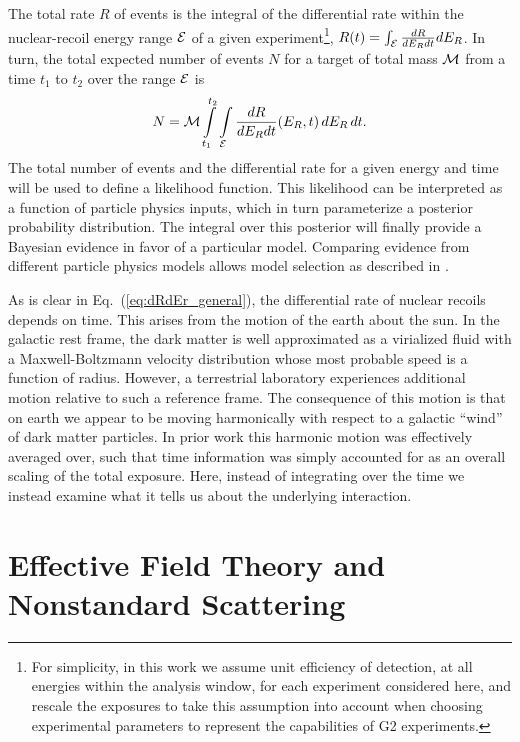 \documentclass[11pt]{article}
\newcommand{\beq}{\begin{equation}} \newcommand{\eeq}{\end{equation}}
\newcommand{\Eq}[1]{Eq.~(\ref{#1})} \newcommand{\Eqs}[2]{Eqs.~(\ref{#1}) and (\ref{#2})} \newcommand{\Eqm}[2]{Eqs.~(\ref{#1}) through (\ref{#2})}
\begin{document}
The total rate $R$ of events is the integral of the differential rate within the nuclear-recoil energy range ${\cal E}$ of a given experiment\footnote{For simplicity, in this work we assume unit efficiency of detection, at all energies within the analysis window, for each experiment considered here, and rescale the exposures to take this assumption into account when choosing experimental parameters to represent the capabilities of G2 experiments.}, $R(t)=\int_{\cal E} \frac{dR}{dE_R dt} dE_R$. In turn, the total expected number of events $N$ for a target of total mass ${\cal M}$ from a time $t_1$ to $t_2$ over the range ${\cal E}$ is
\beq
N =  \cM \int\limits_{t_1}^{t_2} \int\limits_\cE  \frac{dR}{dE_R dt}(E_R,t)\,dE_R \,dt.
\eeq
The total number of events and the differential rate for a given energy and time will be used to define a likelihood function. This likelihood can be interpreted as a function of particle physics inputs, which in turn parameterize a posterior probability distribution. The integral over this posterior will finally provide a Bayesian evidence in favor of a particular model. Comparing evidence from different particle physics models allows model selection as described in \cite{Gluscevic:2014vga, Gluscevic:2015sqa}.

As is clear in \Eq{eq:dRdEr_general}, the differential rate of nuclear recoils depends on time. This arises from the motion of the earth about the sun. In the galactic rest frame, the dark matter is well approximated as a virialized fluid with a Maxwell-Boltzmann velocity distribution whose most probable speed is a function of radius. However, a terrestrial laboratory experiences additional motion relative to such a reference frame. The consequence of this motion is that on earth we appear to be moving harmonically with respect to a galactic ``wind'' of dark matter particles. In prior work this harmonic motion was effectively averaged over, such that time information was simply accounted for as an overall scaling of the total exposure. Here, instead of integrating over the time we instead examine what it tells us about the underlying interaction.

\section{Effective Field Theory and Nonstandard Scattering}
\end{document}
